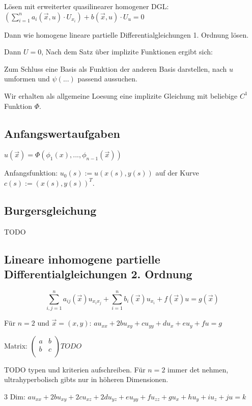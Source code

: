 \documentclass[10pt,a4paper]{article}
\begin{document}
Lösen mit erweiterter quasilinearer homogener DGL: $\left( \sum\limits_{i=1}^n a_i(\vec{x}, u)\cdot U_{x_i} \right) + b(\vec{x}, u)\cdot U_u = 0$

Dann wie homogene lineare partielle Differentialgleichungen 1. Ordnung lösen.

Dann $U = 0$, Nach dem Satz über implizite Funktionen ergibt sich:

Zum Schluss eine Basis als Funktion der anderen Basis darstellen, nach $u$ umformen und $\psi(...)$ passend aussuchen.

Wir erhalten als allgemeine Loesung eine implizite Gleichung mit beliebige $C^1$ Funktion $\Phi$.	

\subsection{Anfangswertaufgaben}
$u(\vec{x}) = \Phi(\phi_1({x}), ... , \phi_{n-1}(\vec{x}))$

Anfangsfunktion: $u_0(s) := u(x(s), y(s))$ auf der Kurve $c(s) := (x(s), y(s))^T$.

\subsection{Burgersgleichung}
TODO

\subsection{Lineare inhomogene partielle Differentialgleichungen 2. Ordnung}
\[
\sum\limits_{i,j=1}^n a_{ij}(\vec{x})u_{x_ix_j} + \sum\limits_{i=1}^n b_i(\vec{x}) u_{x_i} + f(\vec{x})u = g(\vec{x})
\]

Für $n=2$ und $\vec{x}=(x,y)$: $au_{xx} +2bu_{xy}+cu_{yy} + du_x+eu_y+fu=g$

Matrix: $
\left(
\begin{matrix}
a & b \\
b & c \\
\end{matrix}
\right)
TODO
$

TODO typen und kriterien aufschreiben. Für $n=2$ immer det nehmen, ultrahyperbolisch gibts nur in höheren Dimensionen.

3 Dim: $au_{xx}+2bu_{xy}+2cu_{xz}+2du_{yz}+eu_{yy}+fu_{zz}+gu_x +hu_y+iu_z+ju=k$
\end{document}
